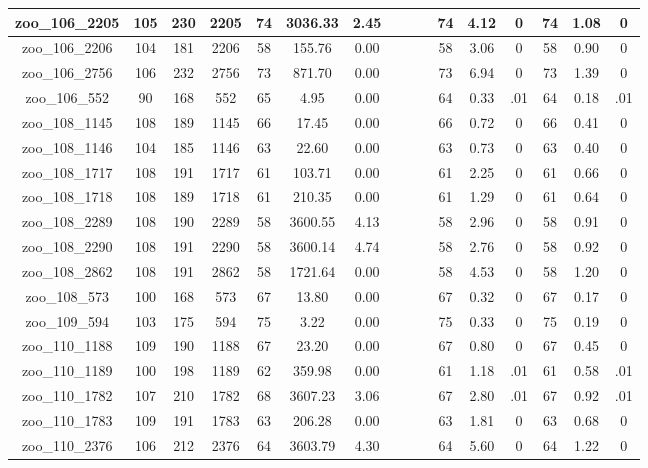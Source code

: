 \begin{landscape}
\begin{longtable}{|c|c|c|c|c|c|c|c|c|c|c|c|c|c|c|c|}
zoo\_106\_2205 & 105 & 230 & 2205 & 74 & 3036.33 & 2.45 &  &  &  & 74 & 4.12 & 0 & 74 & 1.08 & 0 \\ \hline 
zoo\_106\_2206 & 104 & 181 & 2206 & 58 & 155.76 & 0.00 &  &  &  & 58 & 3.06 & 0 & 58 & 0.90 & 0 \\ \hline 
zoo\_106\_2756 & 106 & 232 & 2756 & 73 & 871.70 & 0.00 &  &  &  & 73 & 6.94 & 0 & 73 & 1.39 & 0 \\ \hline 
zoo\_106\_552 & 90 & 168 & 552 & 65 & 4.95 & 0.00 &  &  &  & 64 & 0.33 & .01 & 64 & 0.18 & .01 \\ \hline 
zoo\_108\_1145 & 108 & 189 & 1145 & 66 & 17.45 & 0.00 &  &  &  & 66 & 0.72 & 0 & 66 & 0.41 & 0 \\ \hline 
zoo\_108\_1146 & 104 & 185 & 1146 & 63 & 22.60 & 0.00 &  &  &  & 63 & 0.73 & 0 & 63 & 0.40 & 0 \\ \hline 
zoo\_108\_1717 & 108 & 191 & 1717 & 61 & 103.71 & 0.00 &  &  &  & 61 & 2.25 & 0 & 61 & 0.66 & 0 \\ \hline 
zoo\_108\_1718 & 108 & 189 & 1718 & 61 & 210.35 & 0.00 &  &  &  & 61 & 1.29 & 0 & 61 & 0.64 & 0 \\ \hline 
zoo\_108\_2289 & 108 & 190 & 2289 & 58 & 3600.55 & 4.13 &  &  &  & 58 & 2.96 & 0 & 58 & 0.91 & 0 \\ \hline 
zoo\_108\_2290 & 108 & 191 & 2290 & 58 & 3600.14 & 4.74 &  &  &  & 58 & 2.76 & 0 & 58 & 0.92 & 0 \\ \hline 
zoo\_108\_2862 & 108 & 191 & 2862 & 58 & 1721.64 & 0.00 &  &  &  & 58 & 4.53 & 0 & 58 & 1.20 & 0 \\ \hline 
zoo\_108\_573 & 100 & 168 & 573 & 67 & 13.80 & 0.00 &  &  &  & 67 & 0.32 & 0 & 67 & 0.17 & 0 \\ \hline 
zoo\_109\_594 & 103 & 175 & 594 & 75 & 3.22 & 0.00 &  &  &  & 75 & 0.33 & 0 & 75 & 0.19 & 0 \\ \hline 
zoo\_110\_1188 & 109 & 190 & 1188 & 67 & 23.20 & 0.00 &  &  &  & 67 & 0.80 & 0 & 67 & 0.45 & 0 \\ \hline 
zoo\_110\_1189 & 100 & 198 & 1189 & 62 & 359.98 & 0.00 &  &  &  & 61 & 1.18 & .01 & 61 & 0.58 & .01 \\ \hline 
zoo\_110\_1782 & 107 & 210 & 1782 & 68 & 3607.23 & 3.06 &  &  &  & 67 & 2.80 & .01 & 67 & 0.92 & .01 \\ \hline 
zoo\_110\_1783 & 109 & 191 & 1783 & 63 & 206.28 & 0.00 &  &  &  & 63 & 1.81 & 0 & 63 & 0.68 & 0 \\ \hline 
zoo\_110\_2376 & 106 & 212 & 2376 & 64 & 3603.79 & 4.30 &  &  &  & 64 & 5.60 & 0 & 64 & 1.22 & 0 \\ \hline 

\end{longtable}
\end{landscape}
